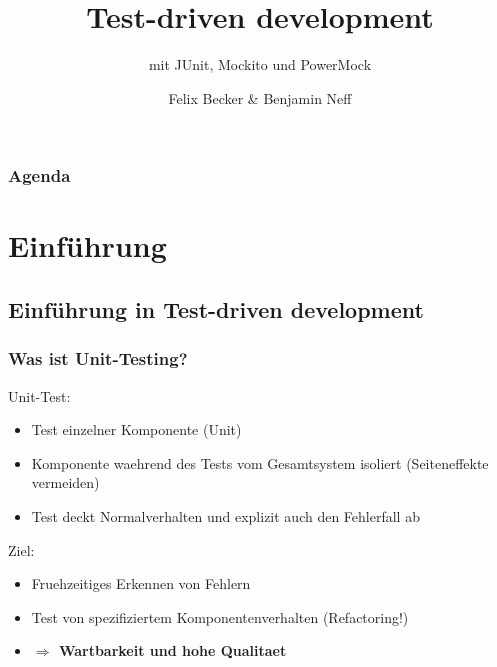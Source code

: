 \documentclass{beamer}
\title{Test-driven development}
\subtitle{mit JUnit, Mockito und PowerMock}
\institute[TD 2k11]{Computerseminar Tondorf 2011}
\author[F. Becker, B. Neff]{
        Felix Becker \& 
	Benjamin Neff
}
\begin{document}
	\begin{frame}
		\titlepage
	\end{frame}

	\begin{frame}
		\frametitle{Agenda}
		\setcounter{tocdepth}{1}
		\tableofcontents
	\end{frame}
	

	\logo{}
	\section{Einführung}
	
		\subsection{Einführung in Test-driven development}

			\begin{frame}
				\frametitle{Was ist Unit-Testing?}
				Unit-Test:
				\begin{itemize}
					\item{Test einzelner Komponente (Unit)}
					\item{Komponente waehrend des Tests vom Gesamtsystem isoliert (Seiteneffekte vermeiden)}
					\item{Test deckt Normalverhalten und explizit auch den Fehlerfall ab}
				\end{itemize}
				\pause
				Ziel:
				\begin{itemize}
					\item{Fruehzeitiges Erkennen von Fehlern}
					\item{Test von spezifiziertem Komponentenverhalten (Refactoring!)}
					\item{\color{red}\textbf{$\Rightarrow$ Wartbarkeit und hohe Qualitaet}} %
				\end{itemize}
				
			\end{frame}
\end{document}
